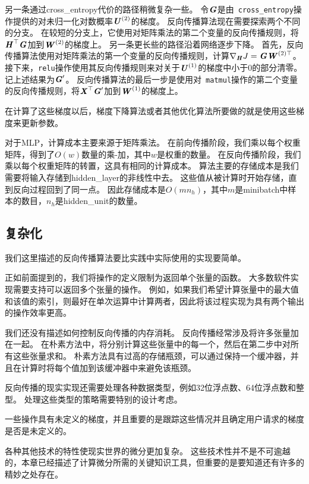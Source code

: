   
另一条通过\gls{cross_entropy}代价的路径稍微复杂一些。
令$\boldsymbol{\mathit{G}}$是由~\verb|cross_entropy|操作提供的对未归一化对数概率$\boldsymbol{\mathit{U}}^{(2)}$的梯度。
反向传播算法现在需要探索两个不同的分支。
在较短的分支上，它使用对矩阵乘法的第二个变量的反向传播规则，将$\boldsymbol{\mathit{H}}^\top \boldsymbol{\mathit{G}}$加到$\boldsymbol{\mathit{W}}^{(2)}$的梯度上。
另一条更长些的路径沿着网络逐步下降。
首先，反向传播算法使用对矩阵乘法的第一个变量的反向传播规则，计算$\nabla_{\boldsymbol{\mathit{H}}} J = \boldsymbol{\mathit{G}}\boldsymbol{\mathit{W}}^{(2)\top}$。
接下来，\verb|relu|操作使用其反向传播规则来对关于$\boldsymbol{\mathit{U}}^{(1)}$的梯度中小于0的部分清零。记上述结果为$\boldsymbol{\mathit{G}}'$。 
反向传播算法的最后一步是使用对~\verb|matmul|操作的第二个变量的反向传播规则，将$\boldsymbol{\mathit{X}}^\top \boldsymbol{\mathit{G}}'$加到$\boldsymbol{\mathit{W}}^{(1)}$的梯度上。

在计算了这些梯度以后，梯度下降算法或者其他优化算法所要做的就是使用这些梯度来更新参数。

对于MLP，计算成本主要来源于矩阵乘法。
在前向传播阶段，我们乘以每个权重矩阵，得到了$O(w)$数量的乘-加，其中$w$是权重的数量。
在反向传播阶段，我们乘以每个权重矩阵的转置，这具有相同的计算成本。
算法主要的存储成本是我们需要将输入存储到\gls{hidden_layer}的非线性中去。
这些值从被计算时开始存储，直到反向过程回到了同一点。
因此存储成本是$O(mn_h)$，其中$m$是\gls{minibatch}中样本的数目，$n_h$是\gls{hidden_unit}的数量。
  
  
\subsection{复杂化}
\label{sec:complications}

我们这里描述的反向传播算法要比实践中实际使用的实现要简单。

正如前面提到的，我们将操作的定义限制为返回单个张量的函数。
大多数软件实现需要支持可以返回多个张量的操作。 
例如，如果我们希望计算张量中的最大值和该值的索引，则最好在单次运算中计算两者，因此将该过程实现为具有两个输出的操作效率更高。

我们还没有描述如何控制反向传播的内存消耗。
反向传播经常涉及将许多张量加在一起。
在朴素方法中，将分别计算这些张量中的每一个，然后在第二步中对所有这些张量求和。 
朴素方法具有过高的存储瓶颈，可以通过保持一个缓冲器，并且在计算时将每个值加到该缓冲器中来避免该瓶颈。

反向传播的现实实现还需要处理各种数据类型，例如32位浮点数、64位浮点数和整型。
处理这些类型的策略需要特别的设计考虑。

一些操作具有未定义的梯度，并且重要的是跟踪这些情况并且确定用户请求的梯度是否是未定义的。

各种其他技术的特性使现实世界的微分更加复杂。 这些技术性并不是不可逾越的，本章已经描述了计算微分所需的关键知识工具，但重要的是要知道还有许多的精妙之处存在。
  
